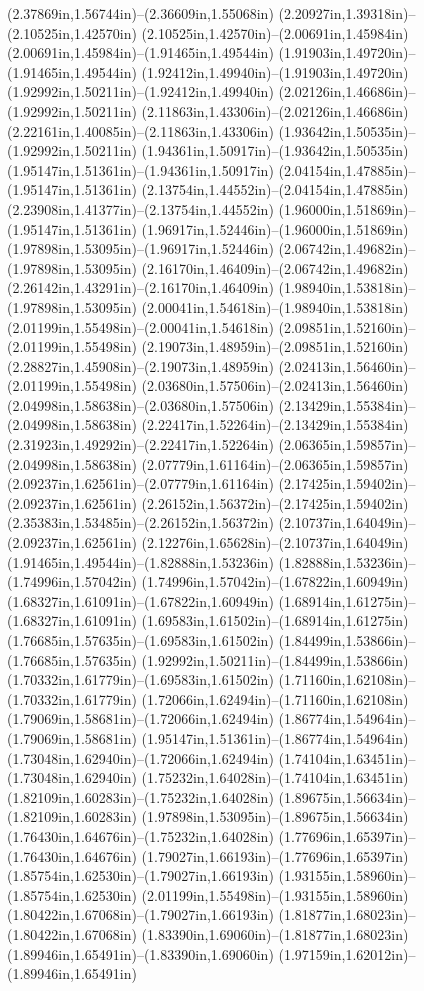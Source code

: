 (2.37869in,1.56744in)--(2.36609in,1.55068in) (2.20927in,1.39318in)--(2.10525in,1.42570in) (2.10525in,1.42570in)--(2.00691in,1.45984in) (2.00691in,1.45984in)--(1.91465in,1.49544in) (1.91903in,1.49720in)--(1.91465in,1.49544in) (1.92412in,1.49940in)--(1.91903in,1.49720in) (1.92992in,1.50211in)--(1.92412in,1.49940in) (2.02126in,1.46686in)--(1.92992in,1.50211in) (2.11863in,1.43306in)--(2.02126in,1.46686in) (2.22161in,1.40085in)--(2.11863in,1.43306in) (1.93642in,1.50535in)--(1.92992in,1.50211in) (1.94361in,1.50917in)--(1.93642in,1.50535in) (1.95147in,1.51361in)--(1.94361in,1.50917in) (2.04154in,1.47885in)--(1.95147in,1.51361in) (2.13754in,1.44552in)--(2.04154in,1.47885in) (2.23908in,1.41377in)--(2.13754in,1.44552in) (1.96000in,1.51869in)--(1.95147in,1.51361in) (1.96917in,1.52446in)--(1.96000in,1.51869in) (1.97898in,1.53095in)--(1.96917in,1.52446in) (2.06742in,1.49682in)--(1.97898in,1.53095in) (2.16170in,1.46409in)--(2.06742in,1.49682in) (2.26142in,1.43291in)--(2.16170in,1.46409in) (1.98940in,1.53818in)--(1.97898in,1.53095in) (2.00041in,1.54618in)--(1.98940in,1.53818in) (2.01199in,1.55498in)--(2.00041in,1.54618in) (2.09851in,1.52160in)--(2.01199in,1.55498in) (2.19073in,1.48959in)--(2.09851in,1.52160in) (2.28827in,1.45908in)--(2.19073in,1.48959in) (2.02413in,1.56460in)--(2.01199in,1.55498in) (2.03680in,1.57506in)--(2.02413in,1.56460in) (2.04998in,1.58638in)--(2.03680in,1.57506in) (2.13429in,1.55384in)--(2.04998in,1.58638in) (2.22417in,1.52264in)--(2.13429in,1.55384in) (2.31923in,1.49292in)--(2.22417in,1.52264in) (2.06365in,1.59857in)--(2.04998in,1.58638in) (2.07779in,1.61164in)--(2.06365in,1.59857in) (2.09237in,1.62561in)--(2.07779in,1.61164in) (2.17425in,1.59402in)--(2.09237in,1.62561in) (2.26152in,1.56372in)--(2.17425in,1.59402in) (2.35383in,1.53485in)--(2.26152in,1.56372in) (2.10737in,1.64049in)--(2.09237in,1.62561in) (2.12276in,1.65628in)--(2.10737in,1.64049in) (1.91465in,1.49544in)--(1.82888in,1.53236in) (1.82888in,1.53236in)--(1.74996in,1.57042in) (1.74996in,1.57042in)--(1.67822in,1.60949in) (1.68327in,1.61091in)--(1.67822in,1.60949in) (1.68914in,1.61275in)--(1.68327in,1.61091in) (1.69583in,1.61502in)--(1.68914in,1.61275in) (1.76685in,1.57635in)--(1.69583in,1.61502in) (1.84499in,1.53866in)--(1.76685in,1.57635in) (1.92992in,1.50211in)--(1.84499in,1.53866in) (1.70332in,1.61779in)--(1.69583in,1.61502in) (1.71160in,1.62108in)--(1.70332in,1.61779in) (1.72066in,1.62494in)--(1.71160in,1.62108in) (1.79069in,1.58681in)--(1.72066in,1.62494in) (1.86774in,1.54964in)--(1.79069in,1.58681in) (1.95147in,1.51361in)--(1.86774in,1.54964in) (1.73048in,1.62940in)--(1.72066in,1.62494in) (1.74104in,1.63451in)--(1.73048in,1.62940in) (1.75232in,1.64028in)--(1.74104in,1.63451in) (1.82109in,1.60283in)--(1.75232in,1.64028in) (1.89675in,1.56634in)--(1.82109in,1.60283in) (1.97898in,1.53095in)--(1.89675in,1.56634in) (1.76430in,1.64676in)--(1.75232in,1.64028in) (1.77696in,1.65397in)--(1.76430in,1.64676in) (1.79027in,1.66193in)--(1.77696in,1.65397in) (1.85754in,1.62530in)--(1.79027in,1.66193in) (1.93155in,1.58960in)--(1.85754in,1.62530in) (2.01199in,1.55498in)--(1.93155in,1.58960in) (1.80422in,1.67068in)--(1.79027in,1.66193in) (1.81877in,1.68023in)--(1.80422in,1.67068in) (1.83390in,1.69060in)--(1.81877in,1.68023in) (1.89946in,1.65491in)--(1.83390in,1.69060in) (1.97159in,1.62012in)--(1.89946in,1.65491in) 